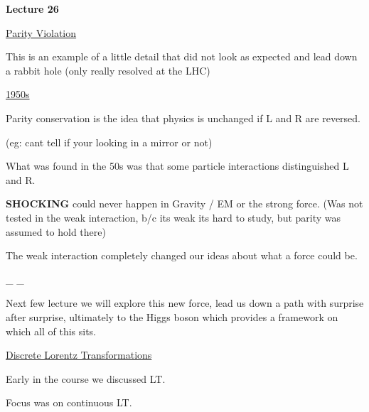 



\thispagestyle{fancy}

\begin{center}
{\huge \textbf{Lecture 26}}
\end{center}

{\fontsize{14}{16}\selectfont

\underline{\underline{Parity Violation}} 

This is an example of a little detail that did not look as expected and lead down a rabbit hole (only really resolved at the LHC) 


\underline{1950s}

Parity conservation is the idea that physics is unchanged if L and R are reversed. 

(eg: cant tell if your looking in a mirror or not)

What was found in the 50s was that some particle interactions distinguished L and R. 

\textbf{SHOCKING} could never happen in Gravity / EM or the strong force. 
(Was not tested in the weak interaction, b/c its weak its hard to study, but parity was assumed to hold there)

The weak interaction completely changed our ideas about what a force could be.


\be
{}  \underbrace{\rightarrow}_{}  \underbrace{\rightarrow}_{} 
\ee


Next few lecture we will explore this new force, lead us down a path with surprise after surprise, ultimately to the Higgs boson which provides a framework on which all of this sits. 


\lineacross

\clearpage

\underline{Discrete Lorentz Transformations}

Early in the course we discussed LT.

Focus was on continuous LT.  

}
